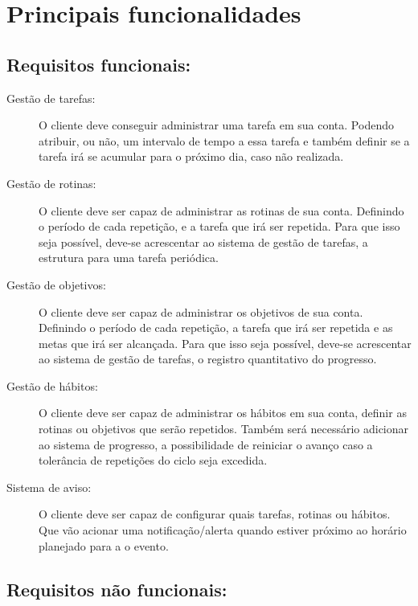\chapter{Principais funcionalidades}

\section{Requisitos funcionais:}
\begin{description}

  \item[Gestão de tarefas:] O cliente deve conseguir administrar uma tarefa
    em sua conta. Podendo atribuir, ou não, um intervalo de tempo a essa tarefa e
    também definir se a tarefa irá se acumular para o próximo dia, caso não
    realizada.

  \item[Gestão de rotinas:] O cliente deve ser capaz de administrar as rotinas
    de sua conta. Definindo o período de cada repetição, e a tarefa que irá ser repetida.
    Para que isso seja possível, deve-se acrescentar ao sistema de gestão de tarefas,
    a estrutura para uma tarefa periódica.

  \item[Gestão de objetivos:] O cliente deve ser capaz de administrar os objetivos
    de sua conta. Definindo o período de cada repetição, a tarefa que irá ser repetida
    e as metas que irá ser alcançada. Para que isso seja possível, deve-se acrescentar
    ao sistema de gestão de tarefas, o registro quantitativo do progresso.

  \item[Gestão de hábitos:] O cliente deve ser capaz de administrar os hábitos
    em sua conta, definir as rotinas ou objetivos que serão repetidos. Também será
    necessário adicionar ao sistema de progresso, a possibilidade de reiniciar o
    avanço caso a tolerância de repetições do ciclo seja excedida.

  \item[Sistema de aviso:] O cliente deve ser capaz de configurar quais
  tarefas, rotinas ou hábitos. Que vão acionar uma notificação/alerta quando
  estiver próximo ao horário planejado para a o evento.

\end{description}

\newpage

\section{Requisitos não funcionais:}

